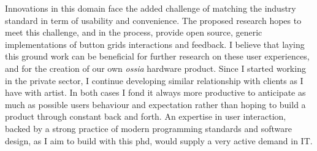 \documentclass[journal,onecolumn]{IEEEtran}
\begin{document}
Innovations in this domain face the added challenge of matching the industry standard in term of usability and convenience. The proposed research hopes to meet this challenge, and in the process, provide open source, generic implementations of button grids interactions and feedback. I believe that laying this ground work can be beneficial for further research on these user experiences, and for the creation of our own \textit{ossia} hardware product.
Since I started working in the private sector, I continue developing similar relationship with clients as I have with artist. In both cases I fond it always more productive to anticipate as much as possible users behaviour and expectation rather than hoping to build a product through constant back and forth. An expertise in user interaction, backed by a strong practice of modern programming standards and software design, as I aim to build with this phd, would supply a very active demand in IT.

%
%

\end{document}
